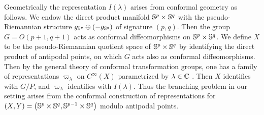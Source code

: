 \documentclass[reqno,12pt]{pja00} %
\makeatletter
\newcommand{\assign}{:=}
\newcommand{\tmop}[1]{\ensuremath{\operatorname{#1}}}
\theoremstyle{definition}
\let\cite\relax
\DeclareRobustCommand{\cite}{%
  \let\new@cite@pre\@gobble
  \@ifnextchar[\new@cite{\@citex[]}}
\def\new@cite[#1]{\@ifnextchar[{\new@citea{#1}}{\@citex[#1]}}
\def\new@citea#1{\def\new@cite@pre{#1}\@citex}
\theoremstyle{exampstyle} \newtheorem{examp}[theorem]{Theorem}
\makeatother
\begin{document}
Geometrically the representation $I (\lambda)$ arises from conformal
geometry as follows. We endow the direct product manifold $\mathbb{S}^p\times\mathbb{S}^q$ with the pseudo-Riemannian structure $g_{\mathbb{S}^p}\oplus\left( -g_{\mathbb{S}^q} \right)$ of signature $(p,q)$.
Then the group $G=O(p+1,q+1)$ acts as conformal diffeomorphisms on $\mathbb{S}^p\times\mathbb{S}^q$. We define $X$ to be the pseudo-Riemannian quotient space of $\mathbb{S}^p\times\mathbb{S}^q$ by identifying
the direct product of
antipodal points,
on which $G$ acts also as conformal diffeomorphisms. Then by the general theory of conformal transformation groups, one has a family of representations $\varpi_\lambda$ on $C^\infty(X)$
parametrized by $\lambda\in\mathbb{C}$ \cite{KO1}. Then $X$ identifies with $G/P$, and $\varpi_\lambda$ identifies with $I(\lambda)$. Thus the
branching problem in our setting arises from the
conformal construction of representations for $(X,Y)=\left( \mathbb{S}^p\times\mathbb{S}^q,\mathbb{S}^{p-1}\times\mathbb{S}^q \right)$ modulo antipodal points.
\end{document}
